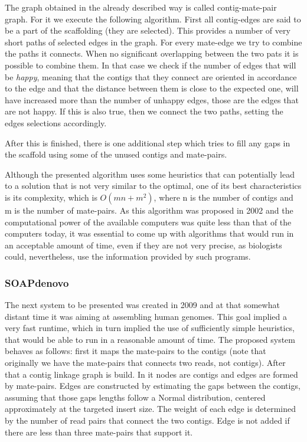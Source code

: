 \documentclass[11pt]{article}
\begin{document}
The graph obtained in the already described way is called contig-mate-pair
graph. For it we execute the following algorithm. First all contig-edges are
said to be a part of the scaffolding (they are selected). This provides a number
of very short paths of selected edges in the graph. For every mate-edge we try
to combine the paths it connects. When no significant overlapping between the
two pats it is possible to combine them. In that case we check if the number of
edges that will be \emph{happy}, meaning that the contigs that they connect are
oriented in accordance to the edge and that the distance between them is close
to the expected one, will have increased more than the number of unhappy edges,
those are the edges that are not happy. If this is also true, then we connect
the two paths, setting the edges selections accordingly.

After this is finished, there is one additional step which tries to fill any
gaps in the scaffold using some of the unused contigs and mate-pairs.

Although the presented algorithm uses some heuristics that can potentially lead
to a solution that is not very similar to the optimal, one of its best
characteristics is its complexity, which is $O(m n + m ^ 2)$, where n is the
number of contigs and m is the number of mate-pairs. As this algorithm was
proposed in 2002 and the computational power of the available computers was
quite less than that of the computers today, it was essential to come up with
algorithms that would run in an acceptable amount of time, even if they are not
very precise, as biologists could, nevertheless, use the information provided by
such programs.

\subsubsection{SOAPdenovo} %
\label{ssub:SOAPdenovo}
The next system to be presented \cite{SOAPdenovo} was created in 2009 and at
that somewhat distant time it was aiming at assembling human genomes. This goal
implied a very fast runtime, which in turn implied the use of sufficiently
simple heuristics, that would be able to run in a reasonable amount of time. The
proposed system behaves as follows: first it maps the mate-pairs to the contigs
(note that originally we have the mate-pairs that connects two reads, not
contigs). After that a contig linkage graph is build. In it nodes are contigs
and edges are formed by mate-pairs. Edges are constructed by estimating the gaps
between the contigs, assuming that those gaps lengths follow a Normal
distribution, centered approximately at the targeted insert size. The weight of
each edge is determined by the number of read pairs that connect the two
contigs. Edge is not added if there are less than three mate-pairs that support
it. 
\end{document}

